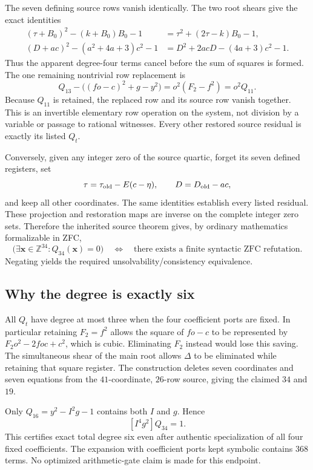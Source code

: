 The seven defining source rows vanish identically.  The two root shears
give the exact identities
\begin{align*}
 (\tau+B_0)^2-(k+B_0)B_0-1
   &=\tau^2+(2\tau-k)B_0-1,\\
 (D+ac)^2-(a^2+4a+3)c^2-1
   &=D^2+2acD-(4a+3)c^2-1.
\end{align*}
Thus the apparent degree-four terms cancel before the sum of squares is
formed.  The one remaining nontrivial row replacement is
\begin{equation}
 Q_{13}-\bigl((fo-c)^2+g-y^2\bigr)
       =o^2(F_2-f^2)=o^2Q_{11}.
 \label{eq:square-remainder}
\end{equation}
Because $Q_{11}$ is retained, the replaced row and its source row vanish
together.  This is an invertible elementary row operation on the system,
not division by a variable or passage to rational witnesses.  Every other
restored source residual is exactly its listed $Q_t$.

Conversely, given any integer zero of the source quartic, forget its seven
defined registers, set
\[
 \tau=\tau_{\rm old}-E(c-\eta),\qquad D=D_{\rm old}-ac,
\]
and keep all other coordinates.  The same identities establish every
listed residual.  These projection and restoration maps are inverse on
the complete integer zero sets.  Therefore the inherited source theorem
gives, by ordinary mathematics formalizable in ZFC,
\[
 \bigl(\exists\mathbf x\in\mathbb Z^{34}:Q_{34}(\mathbf x)=0\bigr)
 \quad\Longleftrightarrow\quad
 \text{there exists a finite syntactic ZFC refutation}.
\]
Negating yields the required unsolvability/consistency equivalence.

\subsection{Why the degree is exactly six}

All $Q_t$ have degree at most three when the four coefficient ports are
fixed.  In particular retaining $F_2=f^2$ allows the square of $fo-c$ to
be represented by $F_2o^2-2foc+c^2$, which is cubic.  Eliminating $F_2$
instead would lose this saving.  The simultaneous shear of the main root
allows $\Delta$ to be eliminated while retaining that square register.
The construction deletes seven coordinates and seven equations from the
$41$-coordinate, $26$-row source, giving the claimed $34$ and $19$.

Only $Q_{16}=y^2-I^2g-1$ contains both $I$ and $g$.  Hence
\[
 [I^4g^2]Q_{34}=1.
\]
This certifies exact total degree six even after authentic specialization
of all four fixed coefficients.  The expansion with coefficient ports
kept symbolic contains $368$ terms.  No optimized arithmetic-gate claim is
made for this endpoint.

